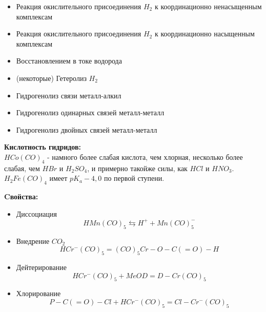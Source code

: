 \begin{itemize}
	\item Реакция окислительного присоединения $H_2$ к координационно ненасыщенным комплексам
	\begin{figure} [H]
		\centering {\texttt{[image: oo4]}}
	\end{figure}
	\item Реакция окислительного присоединения $H_2$ к координационно насыщенным комплексам
	\begin{figure} [H]
		\centering {\texttt{[image: oo5]}}
	\end{figure}	
	\item Восстановлением в токе водорода
	\begin{figure} [H]
		\centering {\texttt{[image: oo6]}}
	\end{figure}
	\item (некоторые) Гетеролиз $H_2$
	\begin{figure} [H]
		\centering {\texttt{[image: oo7]}}
	\end{figure}
	\item Гидрогенолиз связи металл-алкил
	\begin{figure} [H]
		\centering {\texttt{[image: oo8]}}
	\end{figure}
	\item Гидрогенолиз одинарных связей металл-металл
	\begin{figure} [H]
		\centering {\texttt{[image: oo9]}}
	\end{figure}
	\item Гидрогенолиз двойных связей металл-металл
	\begin{figure} [H]
		\centering {\texttt{[image: oo10]}}
	\end{figure}
\end{itemize}
\textbf{Кислотность гидридов:} \\
$HCo(CO)_4$ - намного более слабая кислота, чем хлорная, несколько более слабая, чем $HBr$ и $H_2SO_4$, и примерно такойже силы, как $HCl$ и  $HNO_3$. $H_2Fe(CO)_4$ имеет $pK_a - 4,0$ по первой ступени.
\begin{figure} [H]
	\centering {\texttt{[image: oo11]}}
\end{figure}
\begin{figure} [H]
	\centering {\texttt{[image: oo12]}}
\end{figure}
\textbf{Cвойства:} 
\begin{itemize}
	\item Диссоциация
	\[
	HMn(CO)_5 \leftrightarrows H^+ + Mn(CO)_5^-
	\]
	\item Внедрение $CO_2$
	\[
	HCr^-(CO)_5 = (CO)_5Cr - O - C(=O) - H
	\]
	\item Дейтерирование
	\[
	HCr^-(CO)_5 + MeOD = D- Cr(CO)_5
	\] 
	\item Хлорирование
	\[
	P - C(=O) - Cl + HCr^-(CO)_5 = Cl - Cr^-(CO)_5
	\]
\end{itemize}


